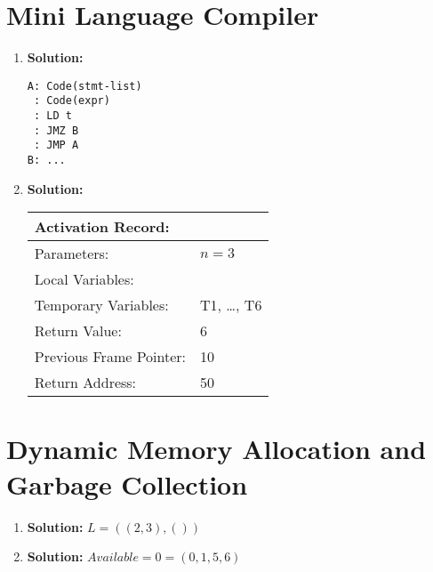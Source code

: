 \documentclass{article}
\begin{document}
\section{Mini Language Compiler}
\begin{enumerate}
    \item \textbf{Solution:}
\begin{center}
\begin{verbatim}
A: Code(stmt-list)
 : Code(expr)
 : LD t
 : JMZ B 
 : JMP A
B: ...
\end{verbatim}
\end{center}
    \item \textbf{Solution:}
\begin{center}
\begin{tabular}{l l}
Activation Record: & \\
\hline
Parameters: &  $n = 3$ \\
Local Variables: & \\
Temporary Variables: & T1, \dots , T6 \\
Return Value: &    6 \\
Previous Frame Pointer: &  10 \\
Return Address: &  50 \\
\end{tabular}
\end{center}

\end{enumerate}
\section{Dynamic Memory Allocation and Garbage Collection}
\begin{enumerate}
    \item \textbf{Solution:} $L = ( (2, 3), ( ) )$
    \item \textbf{Solution:} $Available = 0 = (0, 1, 5, 6)$
\end{enumerate}
\end{document}
